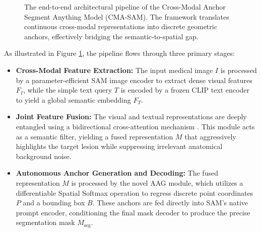 \documentclass[onecolumn]{IEEEtran}
\numberwithin{equation}{section}
\theoremstyle{definition}
\theoremstyle{remark}
\begin{document}
\begin{figure}[!htbp]
{%
}
\caption{The end-to-end architectural pipeline of the Cross-Modal Anchor Segment Anything Model (CMA-SAM). The framework translates continuous cross-modal representations into discrete geometric anchors, effectively bridging the semantic-to-spatial gap.}
\label{fig:cmasam_pipeline}
\end{figure}

As illustrated in Figure \ref{fig:cmasam_pipeline}, the pipeline flows through three primary stages:
\begin{itemize}
    \item \textbf{Cross-Modal Feature Extraction:} The input medical image $I$ is processed by a parameter-efficient SAM image encoder to extract dense visual features $F_I$, while the simple text query $T$ is encoded by a frozen CLIP text encoder to yield a global semantic embedding $F_T$.
    \item \textbf{Joint Feature Fusion:} The visual and textual representations are deeply entangled using a bidirectional cross-attention mechanism \cite{wang2024sam}. This module acts as a semantic filter, yielding a fused representation $M$ that aggressively highlights the target lesion while suppressing irrelevant anatomical background noise.
    \item \textbf{Autonomous Anchor Generation and Decoding:} The fused representation $M$ is processed by the novel AAG module, which utilizes a differentiable Spatial Softmax operation to regress discrete point coordinates $P$ and a bounding box $B$. These anchors are fed directly into SAM's native prompt encoder, conditioning the final mask decoder to produce the precise segmentation mask $M_{\text{seg}}$.
\end{itemize}
\end{document}
